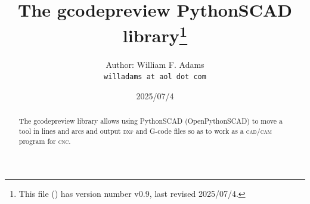 \documentclass{ltxdoc}
\begin{document}
%
%



\def\fileversion{v0.9} \def\filedate{2025/07/4}









\title{The gcodepreview PythonSCAD library\thanks{This
        file (\texttt{\jobname}) has version number \fileversion, last revised
        \filedate.}}

\author{%
Author: William F. Adams\\
\texttt{willadams at aol dot com}
}
\date{\filedate}
\maketitle
\begin{abstract}
\noindent The gcodepreview library allows using PythonSCAD (OpenPythonSCAD) to move a tool in lines and arcs and output \textsc{dxf} and G-code files so as to work as a \textsc{cad}/\allowbreak \textsc{cam} program for \textsc{cnc}.
\end{abstract}
\enlargethispage{\baselineskip}
\tableofcontents
\end{document}
